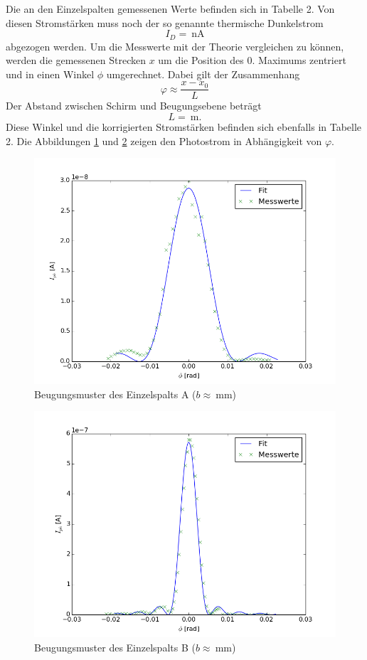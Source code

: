 \documentclass[11pt,ngerman,a4paper]{article}
\begin{document}
Die an den Einzelspalten gemessenen Werte befinden sich in Tabelle 2. Von diesen Stromstärken muss noch der so genannte thermische Dunkelstrom 
\[
I_D = \SI{}{\nano\ampere}
\]
abgezogen werden. Um die Messwerte mit der Theorie vergleichen zu können, werden die gemessenen Strecken $x$ um die Position des 0. Maximums zentriert und in einen Winkel $\phi$ umgerechnet. Dabei gilt der Zusammenhang
\[
\varphi \approx \frac{x-x_0}{L}
\] 
Der Abstand zwischen Schirm und Beugungsebene beträgt
\[
L = \SI{}{\meter} \mathrm{.}
\]
Diese Winkel und die korrigierten Stromstärken befinden sich ebenfalls in Tabelle 2. Die Abbildungen \ref{plot0} und  \ref{plot1} zeigen den Photostrom in Abhängigkeit von $\varphi$.
\begin{figure}[h]
\centering
\includegraphics[scale=0.8]{plot0.png}
\caption{Beugungsmuster des Einzelspalts A ($b \approx \SI{}{\milli\meter}$)}
\label{plot0}
\end{figure}

\begin{figure}[h]
\centering
\includegraphics[scale=0.8]{plot1.png}
\caption{Beugungsmuster des Einzelspalts B ($b \approx \SI{}{\milli\meter}$)}
\label{plot1}
\end{figure}
\end{document}
